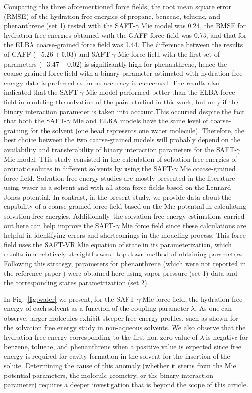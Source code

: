 \documentclass[preprint]{elsarticle}
\begin{document}
	Comparing the three aforementioned force fields, the root mean square error (RMSE) of the hydration free energies of propane, benzene, toluene, and phenanthrene (set 1) tested with the SAFT-$\gamma$ Mie model was 0.24, the RMSE for hydration free energies obtained with the GAFF force field was 0.73, and that for the ELBA coarse-grained force field was 0.44.
	The difference between the results of GAFF ($-5.26 \pm 0.03$) and SAFT-$\gamma$ Mie force field with the first set of parameters ($-3.47 \pm 0.02$) is significantly high for phenanthrene, hence the coarse-grained force field with a binary parameter estimated with hydration free energy data is preferred as far as accuracy is concerned.
	The results also indicated that the SAFT-$\gamma$ Mie model performed better than the ELBA force field in modeling the solvation of the pairs studied in this work, but only if the binary interaction parameter is taken into account.This occurred despite the fact that both the SAFT-$\gamma$ Mie and ELBA models have the same level of coarse-graining for the solvent (one bead represents one water molecule).
	Therefore, the best choice between the two coarse-grained models will probably depend on the availability and transferability of binary interaction parameters for the SAFT-$\gamma$ Mie model.
	This study consisted in the calculation of solvation free energies of aromatic solutes in different solvents by using the SAFT-$\gamma$ Mie coarse-grained force field.
	Solvation free energy studies are mostly presented in the literature using water as a solvent and with all-atom force fields based on the Lennard-Jones potential.
	In contrast, in the present study, we provide data about the capability of a coarse-grained force field based on the Mie potential in calculating solvation free energies.
	Additionally, the solvation free energy estimations carried out here can help improve the SAFT-$\gamma$ Mie force field since these calculations are helpful in identifying errors and shortcomings in the modeling process.
	This force field uses the SAFT-VR Mie equation of state in its parameterization, which results in a relatively straightforward top-down method of obtaining parameters.
	Following this strategy, parameters for phenanthrene (which were not reported in the reference paper \cite{muller2017}) were obtained here using vapor pressure (set 1) data and the corresponding states parametrization (set 2).

	In Fig.~\ref{fig:water} we present, for the SAFT-$\gamma$ Mie force field, the hydration free energy of each solvent as a function of the coupling parameter $\lambda$.
	As one can observe, larger molecules exhibit steeper free energy profiles, such as shown for the solvation free energy study in non-aqueous solvents.
	We also observe that the hydration free energy corresponding to the first non-zero value of $\lambda$ is negative for benzene, toluene, and phenanthrene when a positive value is expected since free energy is required for cavity formation in the solvent for the insertion of the solute.
	Determining the cause of this anomaly (whether it stems from the Mie potential parameters, the molecule geometry, or the binary interaction parameter) requires a deeper investigation that is beyond the scope of this article.
	
\end{document}
